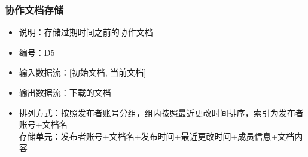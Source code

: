             \subsubsection{协作文档存储}
            \begin{itemize}
                \item 说明：存储过期时间之前的协作文档
                \item 编号：D5
                \item 输入数据流：[初始文档, 当前文档]
                \item 输出数据流：下载的文档
                \item 排列方式：按照发布者账号分组，组内按照最近更改时间排序，索引为发布者账号+文档名\\
                         存储单元：发布者账号+文档名+发布时间+最近更改时间+成员信息+文档内容\\
            \end{itemize}
